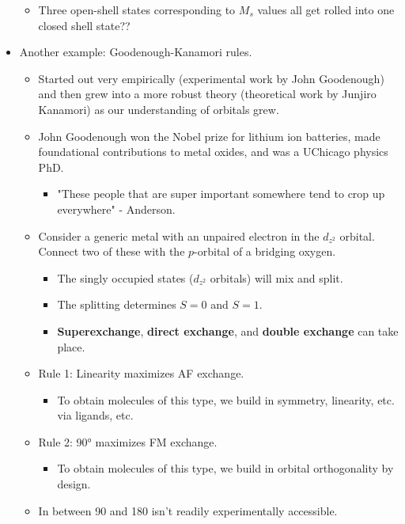 \documentclass[../notes.tex]{subfiles}
\begin{document}
\begin{itemize}
\begin{itemize}
\begin{itemize}
        \end{itemize}
        \item Three open-shell states corresponding to $M_s$ values all get rolled into one closed shell state??
    \end{itemize}
    \item Another example: Goodenough-Kanamori rules.
    \begin{itemize}
        \item Started out very empirically (experimental work by John Goodenough) and then grew into a more robust theory (theoretical work by Junjiro Kanamori) as our understanding of orbitals grew.
        \item John Goodenough won the Nobel prize for lithium ion batteries, made foundational contributions to metal oxides, and was a UChicago physics PhD.
        \begin{itemize}
            \item "These people that are super important somewhere tend to crop up everywhere" - Anderson.
        \end{itemize}
        \item Consider a generic metal with an unpaired electron in the $d_{z^2}$ orbital. Connect two of these with the $p$-orbital of a bridging oxygen.
        \begin{itemize}
            \item The singly occupied states ($d_{z^2}$ orbitals) will mix and split.
            \item The splitting determines $S=0$ and $S=1$.
            \item \textbf{Superexchange}, \textbf{direct exchange}, and \textbf{double exchange} can take place.
        \end{itemize}
        \item Rule 1: Linearity maximizes AF exchange.
        \begin{itemize}
            \item To obtain molecules of this type, we build in symmetry, linearity, etc. via ligands, etc.
        \end{itemize}
        \item Rule 2: \ang{90} maximizes FM exchange.
        \begin{itemize}
            \item To obtain molecules of this type, we build in orbital orthogonality by design.
        \end{itemize}
        \item In between \num{90} and \num{180} isn't readily experimentally accessible.

\end{itemize}
\end{itemize}
\end{document}
